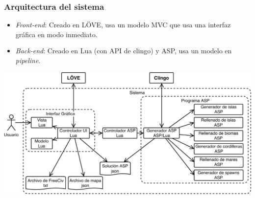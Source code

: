 \begin{frame}
\frametitle{Arquitectura del sistema}

\begin{itemize}
	\item<1-> \textcolor{UDCpink}{\itshape Front-end}: Creado en \textcolor{UDCpink}{LÖVE}, usa un modelo MVC que usa una interfaz gráfica en modo inmediato.
	
	\vspace{0.5em}
	
	\item<2-> \textcolor{UDCpink}{\itshape Back-end}: Creado en \textcolor{UDCpink}{Lua} (con API de clingo) y \textcolor{UDCpink}{ASP}, usa un modelo en \textit{pipeline}.
\end{itemize}

\pause[3]

\begin{center}
	\includegraphics[width=.95\textwidth]{images/arquitectura-completa.pdf}
\end{center}

\end{frame}

